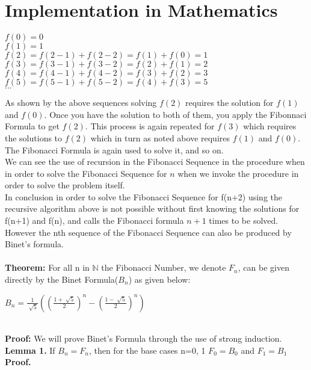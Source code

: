\documentclass{article}
\begin{document}
\section{Implementation in Mathematics}
\begin{center}
$f(0)=0$
\\
$f(1)=1$
\\
$f(2)=f(2-1)+f(2-2)=f(1)+f(0)=1$
\\
$f(3)=f(3-1)+f(3-2)=f(2)+f(1)=2$
\\
$f(4)=f(4-1)+f(4-2)=f(3)+f(2)=3$
\\
$f(5)=f(5-1)+f(5-2)=f(4)+f(3)=5$
\\
$...$
\\
\end{center}
As shown by the above sequences solving $f(2)$ requires the solution for $f(1)$ and $f(0)$.  Once you have the solution to both of them, you apply the Fibonnaci Formula to get $f(2)$.  This process is again repeated for $f(3)$ which requires the solutions to $f(2)$ which in turn as noted above requires $f(1)$ and $f(0)$.  The Fibonacci Formula is again used to solve it, and so on.  
\\
We can see the use of recursion in the Fibonacci Sequence in the procedure when in order to solve the Fibonacci Sequence for $n$ when we invoke the procedure in order to solve the problem itself.   
\\
In conclusion in order to solve the Fibonacci Sequence for f(n+2) using the recursive algorithm above is not possible without first knowing the solutions for f(n+1) and f(n), and calls the Fibonacci formula $n+1$ times to be solved.  
\\
However the nth sequence of the Fibonacci Sequence can also be produced by Binet's formula.
\\
\\
{\bf Theorem:} For all n in $\mathbb{N}$ the Fibonacci Number, we denote $F_n$, can be given directly by the Binet Formula($B_n$) as given below:
\\
\begin{center}
	$B_n=\frac{1}{\sqrt[]{5}}((\frac{1+\sqrt[]{5}}{2})^n-(\frac{1-\sqrt[]{5}}{2})^n)$
\end{center}
~\\
{\bf Proof:} We will prove Binet's Formula through the use of strong induction.
\\
{\bf Lemma 1.} 
If $B_n=F_n$, then for the base cases n=0, 1 $F_0=B_0$ and $F_1=B_1$  
\\
{\bf Proof.}
\\
\end{document}
